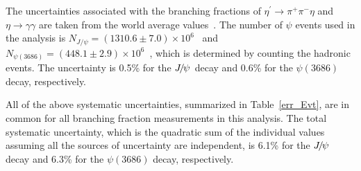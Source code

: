\documentclass[twocolumn,showpacs,aps,prd]{revtex4-1}
\newcommand{\psip}{\psi(3686)}
\begin{document}
The uncertainties associated with the branching fractions of $\eta^\prime\to \pi^+\pi^-\eta$ and $\eta\to \gamma\gamma$ are taken from the world average values~\cite{pdg}. The number of $\psi$ events used in the analysis is $N_{J/\psi} = (1310.6 \pm 7.0)\times 10^6$~\cite{jpsinumber} and $N_{\psip} =
(448.1\pm2.9)\times 10^6$~\cite{psipnumber09,psipnumber12}, which is determined by counting the hadronic events. The uncertainty is 0.5\% for the ${J\mskip -3mu/\mskip -2mu\psi\mskip 2mu}$ decay and 0.6\% for the $\psip$ decay, respectively.

All of the above systematic uncertainties, summarized in Table~\ref{err_Evt}, are in common for all branching fraction measurements in this analysis. The total systematic uncertainty, which is the quadratic sum of the individual values assuming all the sources of uncertainty are independent, is 6.1\% for the ${J\mskip -3mu/\mskip -2mu\psi\mskip 2mu}$ decay and 6.3\% for the $\psip$ decay, respectively.
\end{document}
